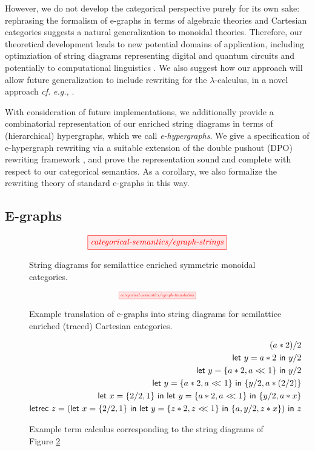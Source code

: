 However, we do not develop the categorical perspective purely for its own sake: rephrasing the formalism of e-graphs in terms of algebraic theories and Cartesian categories suggests a natural generalization to monoidal theories. Therefore, our theoretical development leads to new potential domains of application, including optimziation of string diagrams representing digital \cite{ghica_compositional_2023} and quantum circuits
\cite{coecke_interacting_2011,ZX} and potentially to computational linguistics \cite{wazni_quantum_2022,coecke_lambek_2013}.  We also suggest how our approach will allow future  generalization to include rewriting for the $\lambda$-calculus,  in a novel approach \textit{cf.} \textit{e.g.,}
\cite{koehler2022sketchguided}. %

With consideration of future implementations, we 
additionally provide a combinatorial representation of our enriched string diagrams in terms of (hierarchical)  hypergraphs, which we call \textit{e-hypergraphs}.  We give a specification of e-hypergraph rewriting via a suitable extension of the double pushout (DPO) rewriting framework 
\cite{dpo, bonchi_string_2022-1,bonchi_string_2022-2,bonchi_string_2022}, and prove the representation sound and complete with respect to our categorical semantics.  As a corollary, we also formalize the rewriting theory of standard e-graphs in this way.  %

\subsection{E-graphs}

\begin{figure}\label{fig:egraph-strings}
\[
    \tikzfig{categorical-semantics/egraph-strings}
\]
\caption{String diagrams for semilattice enriched symmetric monoidal categories.}
\end{figure}

\begin{figure}\label{fig:e-graph-example}
\[
    \scalebox{0.5}{
    \tikzfig{categorical-semantics/egraph-translation}
    }
\]
\caption{Example translation of e-graphs into string diagrams for semilattice enriched (traced) Cartesian categories.}
\end{figure}

\begin{figure}\label{fig:let-calculus}
\begin{align*}
    (a*2)/2 \\
    \mylet{y}{a*2} y/2 \\ 
    \mylet{y}{\{a*2,a<\!\!<1\}} y/2 \\
    \mylet{y}{\{a*2,a<\!\!<1\}} \{y/2, a*(2/2)\} \\
    \mylet{x}{\{2/2, 1\}} \mylet{y}{\{a*2, a <\!\!< 1\}} \{y/2, a*x\} \\
    \textsf{letrec } z = (\mylet{x}{\{2/2, 1\}} \mylet{y}{\{z*2, z <\!\!< 1\}} \{a, y/2, z*x\}) \textsf{ in } z
\end{align*}
\caption{Example term calculus corresponding to the string diagrams of Figure \ref{fig:e-graph-example}}
\end{figure}

